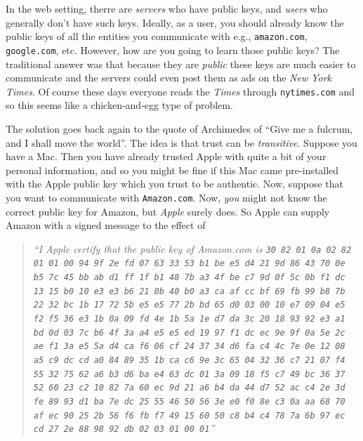 In the web setting, therre are \emph{servers} who have public keys, and
\emph{users} who generally don't have such keys. Ideally, as a user, you
should already know the public keys of all the entities you communicate
with e.g., \texttt{amazon.com}, \texttt{google.com}, etc. However, how
are you going to learn those public keys? The traditional answer was
that because they are \emph{public} these keys are much easier to
communicate and the servers could even post them as ads on the \emph{New
York Times}. Of course these days everyone reads the \emph{Times}
through \texttt{nytimes.com} and so this seems like a chicken-and-egg
type of problem.

The solution goes back again to the quote of Archimedes of ``Give me a
fulcrum, and I shall move the world''. The idea is that trust can be
\emph{transitive}. Suppose you have a Mac. Then you have already trusted
Apple with quite a bit of your personal information, and so you might be
fine if this Mac came pre-installed with the Apple public key which you
trust to be authentic. Now, suppose that you want to communicate with
\texttt{Amazon.com}. Now, \emph{you} might not know the correct public
key for Amazon, but \emph{Apple} surely does. So Apple can supply Amazon
with a signed message to the effect of

\begin{quote}
\emph{``I Apple certify that the public key of Amazon.com is
\texttt{30 82 01 0a 02 82 01 01 00 94 9f 2e fd 07 63 33 53 b1 be e5 d4 21 9d 86 43 70 0e b5 7c 45 bb ab d1 ff 1f b1 48 7b a3 4f be c7 9d 0f 5c 0b f1 dc 13 15 b0 10 e3 e3 b6 21 0b 40 b0 a3 ca af cc bf 69 fb 99 b8 7b 22 32 bc 1b 17 72 5b e5 e5 77 2b bd 65 d0 03 00 10 e7 09 04 e5 f2 f5 36 e3 1b 0a 09 fd 4e 1b 5a 1e d7 da 3c 20 18 93 92 e3 a1 bd 0d 03 7c b6 4f 3a a4 e5 e5 ed 19 97 f1 dc ec 9e 9f 0a 5e 2c ae f1 3a e5 5a d4 ca f6 06 cf 24 37 34 d6 fa c4 4c 7e 0e 12 08 a5 c9 dc cd a0 84 89 35 1b ca c6 9e 3c 65 04 32 36 c7 21 07 f4 55 32 75 62 a6 b3 d6 ba e4 63 dc 01 3a 09 18 f5 c7 49 bc 36 37 52 60 23 c2 10 82 7a 60 ec 9d 21 a6 b4 da 44 d7 52 ac c4 2e 3d fe 89 93 d1 ba 7e dc 25 55 46 50 56 3e e0 f0 8e c3 0a aa 68 70 af ec 90 25 2b 56 f6 fb f7 49 15 60 50 c8 b4 c4 78 7a 6b 97 ec cd 27 2e 88 98 92 db 02 03 01 00 01}''}
\end{quote}

